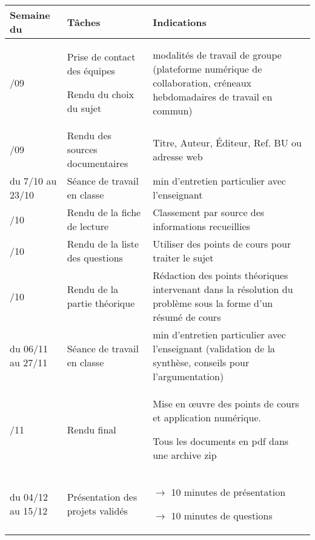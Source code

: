\begin{center}
\begin{tabular}{|p{}|p{}|p{}|}
\hline
\size Semaine du	& \size Tâches						& \size Indications\\
\hline
\hline
\size 23/09				& \size Prise de contact des équipes \par Rendu du choix du sujet	& \size modalités de travail de groupe (plateforme numérique de collaboration, créneaux hebdomadaires de travail en commun)\\
\hline
\size 30/09		& \size Rendu des sources documentaires 		& \size Titre, Auteur, Éditeur, Ref. BU ou adresse web \\
\hline
\size du 7/10 au 23/10	& \size Séance de travail en classe 	& \size 30 min d'entretien particulier avec l'enseignant\e \\
\hline
\size 02/10		& \size Rendu de la fiche de lecture	& \size Classement par source des informations recueillies \\
\hline
\size 16/10		& \size Rendu de la liste des questions	& \size Utiliser des points de cours  pour traiter le sujet \\
\hline
\size 30/10		& \size Rendu de la partie théorique	& \size Rédaction des points théoriques intervenant dans la résolution du problème sous la forme d'un résumé de cours \\	\hline
\size du 06/11 au 27/11	& \size Séance de travail en classe 	& \size 30 min d'entretien particulier avec l'enseignant (validation de la synthèse, conseils pour l'argumentation)\\
\hline
\size 27/11		& \size Rendu final & \size Mise en \oe uvre des points de cours et application numérique. \par Tous les documents en pdf dans une archive zip \\
\hline
\size du 04/12 au 15/12 & \size Présentation des projets validés & \size $\rightarrow$ 10 minutes de présentation \par $\rightarrow$ 10 minutes de questions\\
\hline
\end{tabular}
\end{center}
